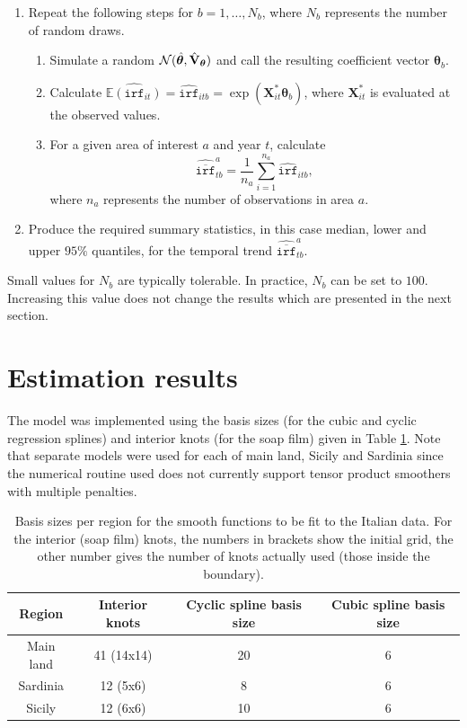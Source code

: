 \begin{enumerate}
	\item Repeat the following steps for $b=1,\ldots,N_b$, where $N_b$ represents the number of random draws. 
	   \begin{enumerate}
	      \item Simulate a random $\mathcal{N}(\hat{\bm\theta}, \hat{{\bf V}}_{\bm\theta} )$ and call the resulting coefficient vector $\bm\theta_b$.
	      \item Calculate $\widehat{\mathbb{E}(\texttt{irf}_{it})}=\widehat{\texttt{irf}}_{itb}=\exp(\mathbf{X}^*_{it}\bm\theta_b)$, where $\mathbf{X}^*_{it}$ is evaluated at the observed values. 
	      \item For a given area of interest $a$ and year $t$, calculate
	      $$\widehat{\overline{\texttt{irf}}}_{tb}^a=\frac{1}{n_a}\sum_{i=1}^{n_a} \widehat{\texttt{irf}}_{itb},$$
	      where $n_a$ represents the number of observations in area $a$.     
	   \end{enumerate}
	\item Produce the required summary statistics, in this case median, lower and upper $95\%$ quantiles, for the temporal trend $\widehat{\overline{\texttt{irf}}}_{tb}^a$.
\end{enumerate}
Small values for $N_b$ are typically tolerable. In practice, $N_b$ can be set to $100$. Increasing this value does not change the results which are presented in the next section.
 

\section{Estimation results \label{ER}}

The model was implemented using the basis sizes (for the cubic and cyclic regression splines) and interior knots (for the soap film) given in Table \ref{soap-basis-table}. Note that separate models were used for each of main land, Sicily and Sardinia since the numerical routine used does not currently support tensor product smoothers with multiple penalties. 

\begin{table}[htbp]
\centering
\begin{tabular}{c c c c}\\
\hline
\hline
Region & Interior knots & Cyclic spline basis size & Cubic spline basis size\\
\hline
Main land & 41 (14x14) & 20 & 6\\
Sardinia & 12 (5x6) & 8 & 6\\
Sicily & 12 (6x6) & 10 & 6\\
\hline
\hline
\end{tabular}
\caption{Basis sizes per region for the smooth functions to be fit to the Italian data. For the interior (soap film) knots, the numbers in brackets show the initial grid, the other number gives the number of knots actually used (those inside the boundary).}
\label{soap-basis-table}
\end{table}

